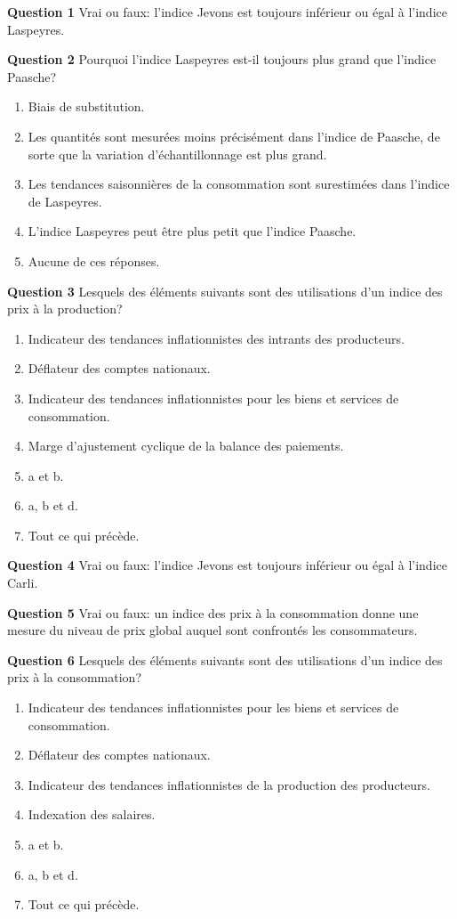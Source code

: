 \documentclass[]{article}
\begin{document}
\textbf{Question 1} Vrai ou faux: l'indice Jevons est toujours inférieur ou égal à l'indice Laspeyres.

\textbf{Question 2} Pourquoi l'indice Laspeyres est-il toujours plus grand que l'indice Paasche?

\begin{enumerate}
\def\labelenumi{\alph{enumi})}
\item
  Biais de substitution.
\item
  Les quantités sont mesurées moins précisément dans l'indice de Paasche, de sorte que la variation d'échantillonnage est
  plus grand.
\item
  Les tendances saisonnières de la consommation sont surestimées dans l'indice de Laspeyres.
\item
  L'indice Laspeyres peut être plus petit que l'indice Paasche.
\item
  Aucune de ces réponses.
\end{enumerate}

\textbf{Question 3} Lesquels des éléments suivants sont des utilisations d'un indice des prix à la production?

\begin{enumerate}
\def\labelenumi{\alph{enumi})}
\item
  Indicateur des tendances inflationnistes des intrants des producteurs.
\item
  Déflateur des comptes nationaux.
\item
  Indicateur des tendances inflationnistes pour les biens et services de consommation.
\item
  Marge d'ajustement cyclique de la balance des paiements.
\item
  a et b.
\item
  a, b et d.
\item
  Tout ce qui précède.
\end{enumerate}

\textbf{Question 4} Vrai ou faux: l'indice Jevons est toujours inférieur ou égal à l'indice Carli.

\textbf{Question 5} Vrai ou faux: un indice des prix à la consommation donne une mesure du niveau de prix global auquel sont confrontés les consommateurs.

\textbf{Question 6} Lesquels des éléments suivants sont des utilisations d'un indice des prix à la consommation?

\begin{enumerate}
\def\labelenumi{\alph{enumi})}
\item
  Indicateur des tendances inflationnistes pour les biens et services de consommation.
\item
  Déflateur des comptes nationaux.
\item
  Indicateur des tendances inflationnistes de la production des producteurs.
\item
  Indexation des salaires.
\item
  a et b.
\item
  a, b et d.
\item
  Tout ce qui précède.
\end{enumerate}
\end{document}
